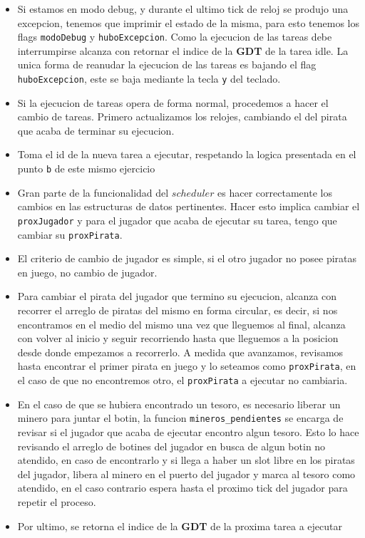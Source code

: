 \begin{itemize}
	\item Si estamos en modo debug, y durante el ultimo tick de reloj se produjo una excepcion, tenemos que imprimir el estado de la misma, para esto tenemos los flags \texttt{modoDebug} y \texttt{huboExcepcion}. Como la ejecucion de las tareas debe interrumpirse alcanza con retornar el indice de la \textbf{GDT} de la tarea idle. La unica forma de reanudar la ejecucion de las tareas es bajando el flag \texttt{huboExcepcion}, este se baja mediante la tecla \texttt{y} del teclado.
	\item Si la ejecucion de tareas opera de forma normal, procedemos a hacer el cambio de tareas. Primero actualizamos los relojes, cambiando el del pirata que acaba de terminar su ejecucion.
	\item Toma el id de la nueva tarea a ejecutar, respetando la logica presentada en el punto \texttt{b} de este mismo ejercicio
	\item Gran parte de la funcionalidad del $scheduler$ es hacer correctamente los cambios en las estructuras de datos pertinentes. Hacer esto implica cambiar el \texttt{proxJugador} y para el jugador que acaba de ejecutar su tarea, tengo que cambiar su \texttt{proxPirata}.
	\item El criterio de cambio de jugador es simple, si el otro jugador no posee piratas en juego, no cambio de jugador.
	\item Para cambiar el pirata del jugador que termino su ejecucion, alcanza con recorrer el arreglo de piratas del mismo en forma circular, es decir, si nos encontramos en el medio del mismo una vez que lleguemos al final, alcanza con volver al inicio y seguir recorriendo hasta que lleguemos a la posicion desde donde empezamos a recorrerlo. A medida que avanzamos, revisamos hasta encontrar el primer pirata en juego y lo seteamos como \texttt{proxPirata}, en el caso de que no encontremos otro, el \texttt{proxPirata} a ejecutar no cambiaria.
	\item En el caso de que se hubiera encontrado un tesoro, es necesario liberar un minero para juntar el botin, la funcion \texttt{mineros\_pendientes} se encarga de revisar si el jugador que acaba de ejecutar encontro algun tesoro. Esto lo hace revisando el arreglo de botines del jugador en busca de algun botin no atendido, en caso de encontrarlo y si llega a haber un slot libre en los piratas del jugador, libera al minero en el puerto del jugador y marca al tesoro como atendido, en el caso contrario espera hasta el proximo tick del jugador para repetir el proceso.
	\item Por ultimo, se retorna el indice de la \textbf{GDT} de la proxima tarea a ejecutar
\end{itemize}

